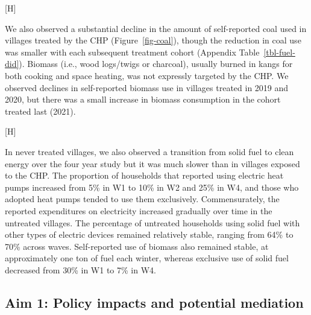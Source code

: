 \documentclass[
  letterpaper,
  DIV=11,
  numbers=noendperiod]{scrartcl}
\makeatletter
\renewenvironment{figure}%
   {\renewcommand\familydefault\sfdefault
    \@float{figure}}
   {\end@float}
\makeatother
\begin{document}
\begin{figure}[H]


\caption{\label{fig-sankey}Transitions to different energy sources
across study waves}

\end{figure}%

We also observed a substantial decline in the amount of self-reported
coal used in villages treated by the CHP (Figure~\ref{fig-coal}), though
the reduction in coal use was smaller with each subsequent treatment
cohort (Appendix Table~\ref{tbl-fuel-did}). Biomass (i.e., wood
logs/twigs or charcoal), usually burned in kangs for both cooking and
space heating, was not expressly targeted by the CHP. We observed
declines in self-reported biomass use in villages treated in 2019 and
2020, but there was a small increase in biomass consumption in the
cohort treated last (2021).

\begin{figure}[H]


\caption{\label{fig-coal}Trends in self-reported coal and biomass, by
treatment season.}

\end{figure}%

In never treated villages, we also observed a transition from solid fuel
to clean energy over the four year study but it was much slower than in
villages exposed to the CHP. The proportion of households that reported
using electric heat pumps increased from 5\% in W1 to 10\% in W2 and
25\% in W4, and those who adopted heat pumps tended to use them
exclusively. Commensurately, the reported expenditures on electricity
increased gradually over time in the untreated villages. The percentage
of untreated households using solid fuel with other types of electric
devices remained relatively stable, ranging from 64\% to 70\% across
waves. Self-reported use of biomass also remained stable, at
approximately one ton of fuel each winter, whereas exclusive use of
solid fuel decreased from 30\% in W1 to 7\% in W4.

\subsection{Aim 1: Policy impacts and potential
mediation}\label{aim-1-policy-impacts-and-potential-mediation}
\end{document}
